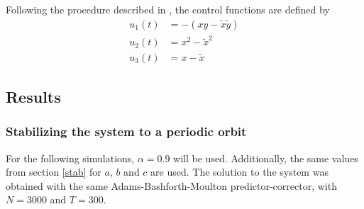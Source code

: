 Following the procedure described in \cite{abd2010chaos}, the control functions are defined by
\begin{equation}
	\begin{array}{ll}
		u_1(t)&=-(xy-\tilde{x}\tilde{y})\\
        u_2(t)&=x^2-\tilde{x}^2\\
        u_3(t)&=x-\tilde{x}
	\end{array}
\end{equation}

\subsection{Results}
\subsubsection{Stabilizing the system to a periodic orbit}
For the following simulations, $\alpha=0.9$ will be used. Additionally, the same values from section \ref{stab} for $a$, $b$ and $c$ are used. The solution to the system was obtained with the same Adams-Bashforth-Moulton predictor-corrector, with $N=3000$ and $T=300$. 
